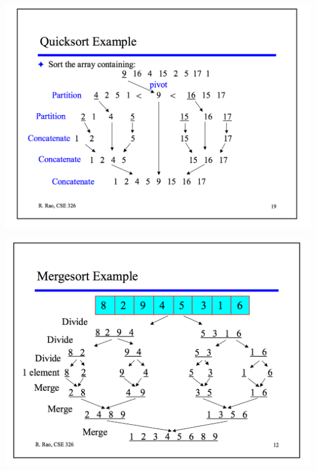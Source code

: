 \documentclass[a4paper,12pt,twoside]{book}
\begin{document}
\begin{itemize}
\includegraphics[scale=0.45]{pics/quick_sort.png} \newline


\includegraphics[scale=0.45]{pics/merge_sort.png} \newline



\end{itemize}
\end{document}
